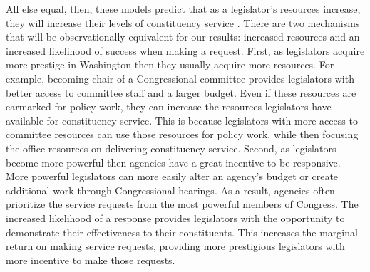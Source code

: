 \documentclass[12pt]{article}
\begin{document}
All else equal, then, these models predict that as a legislator's resources increase, they will increase their levels of constituency service \cite[Proposition 1]{AshworthBuenodeMesquita2006}.  There are two mechanisms that will be observationally equivalent for our results: increased resources and an increased likelihood of success when making a request.  First, as legislators acquire more prestige in Washington then they usually acquire more resources.  For example, becoming chair of a Congressional committee provides legislators with better access to committee staff and a larger budget.  Even if these resources are earmarked for policy work, they can increase the resources legislators have available for constituency service. This is because legislators with more access to committee resources can use those resources for policy work, while then focusing the office resources on delivering constituency service.  Second, as legislators become more powerful then agencies have a great incentive to be responsive.  More powerful legislators can more easily alter an agency's budget or create additional work through Congressional hearings.  As a result, agencies often prioritize the service requests from the most powerful members of Congress.  The increased likelihood of a response provides legislators with the opportunity to demonstrate their effectiveness to their constituents. This increases the marginal return on making service requests, providing more prestigious legislators with more incentive to make those requests.   

\end{document}
